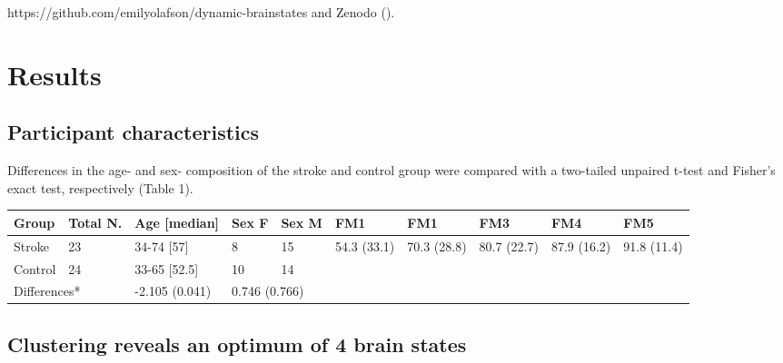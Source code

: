 \documentclass[phd,tocprelim]{cornell}
\begin{document}
	 https://github.com/emilyolafson/dynamic-brainstates and Zenodo (\cite{Olafson2022-ul}).
	 
\section{Results}

 \subsection*{Participant characteristics}
    Differences in the age- and sex- composition of the stroke and control group were compared with a two-tailed unpaired t-test and Fisher's exact test, respectively (Table 1). 
       \begin{center}
    \begin{tabular}{ | m{1.7cm} | m{1.7cm}| m{2cm} |m{1cm} |m{1cm} | m{0.7cm} | m{0.7cm} | m{0.7cm} | m{0.7cm} | m{0.7cm} | } 
   
      \hline
      Group & Total N. & Age [median] & Sex F & Sex M & FM1 & FM1 & FM3 & FM4 & FM5 \\ 
      \hline
      Stroke &  23 & 34-74 [57] & 8 & 15 & 54.3 (33.1) & 70.3 (28.8) & 80.7 (22.7) & 87.9 (16.2) & 91.8 (11.4) \\ 
      \hline
      Control & 24 & 33-65 [52.5] & 10 & 14 & \multicolumn{5}{|l|}{} \\ 
      \hline
       \multicolumn{2}{|l|}{Differences*} & -2.105 (0.041) &\multicolumn{2}{|l|}{ 0.746 (0.766)} &  \multicolumn{5}{|l|}{}   \\
      \hline
    \end{tabular}
    \end{center}

    \subsection*{Clustering reveals an optimum of 4 brain states}
    
\end{document}
